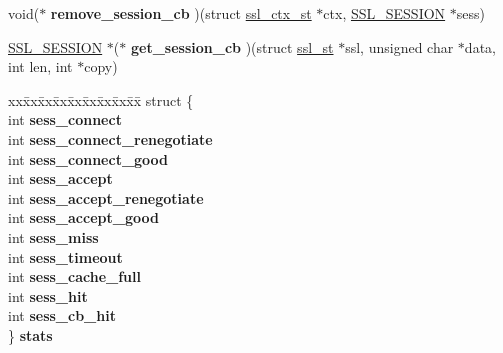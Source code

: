 \begin{DoxyCompactItemize}
void($\ast$ {\bfseries remove\+\_\+session\+\_\+cb} )(struct \hyperlink{structssl__ctx__st}{ssl\+\_\+ctx\+\_\+st} $\ast$ctx, \hyperlink{structssl__session__st}{S\+S\+L\+\_\+\+S\+E\+S\+S\+I\+ON} $\ast$sess)
\item 
\mbox{\label{structssl__ctx__st_ac177321ecedb6c1adc3b8abb703607c2}} 
\hyperlink{structssl__session__st}{S\+S\+L\+\_\+\+S\+E\+S\+S\+I\+ON} $\ast$($\ast$ {\bfseries get\+\_\+session\+\_\+cb} )(struct \hyperlink{structssl__st}{ssl\+\_\+st} $\ast$ssl, unsigned char $\ast$data, int len, int $\ast$copy)
\item 
\mbox{\label{structssl__ctx__st_ad31f5cce407b086601a2d6295c6e2fe0}} 
\begin{tabbing}
xx\=xx\=xx\=xx\=xx\=xx\=xx\=xx\=xx\=\kill
struct \{\\
\>int {\bfseries sess\_connect}\\
\>int {\bfseries sess\_connect\_renegotiate}\\
\>int {\bfseries sess\_connect\_good}\\
\>int {\bfseries sess\_accept}\\
\>int {\bfseries sess\_accept\_renegotiate}\\
\>int {\bfseries sess\_accept\_good}\\
\>int {\bfseries sess\_miss}\\
\>int {\bfseries sess\_timeout}\\
\>int {\bfseries sess\_cache\_full}\\
\>int {\bfseries sess\_hit}\\
\>int {\bfseries sess\_cb\_hit}\\
\} {\bfseries stats}\\


\end{tabbing}
\end{DoxyCompactItemize}
